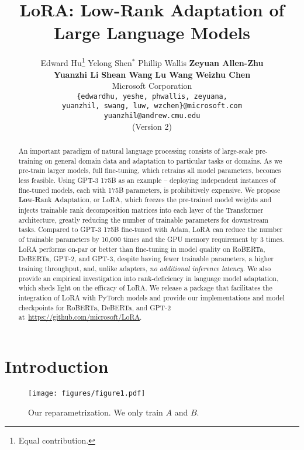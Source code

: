 \documentclass{article} %
\title{LoRA: Low-Rank Adaptation of Large Language Models}
\author{%
  Edward Hu\thanks{Equal contribution.} 
  \qquad Yelong Shen$^*$ 
  \qquad Phillip Wallis
  \qquad \textbf{Zeyuan Allen-Zhu} \\
  \textbf{Yuanzhi Li}
  \qquad \textbf{Shean Wang}
  \qquad \textbf{Lu Wang}
  \qquad \textbf{Weizhu Chen}\\
  Microsoft Corporation \\
  \texttt{\{edwardhu, yeshe, phwallis, zeyuana,} \\
  \texttt{yuanzhil, swang, luw, wzchen\}@microsoft.com} \\
  \texttt{yuanzhil@andrew.cmu.edu} \\
  (Version 2)}
\begin{document}
\maketitle

\begin{abstract}
An important paradigm of natural language processing consists of large-scale pre-training on general domain data and adaptation to particular tasks or domains.
As we pre-train larger models, full fine-tuning, which retrains all model parameters, becomes less feasible.
Using GPT-3 175B as an example -- deploying independent instances of fine-tuned models, each with 175B parameters, is prohibitively expensive.
We propose \textbf{Lo}w-\textbf{R}ank \textbf{A}daptation, or LoRA, which freezes the pre-trained model weights and injects trainable rank decomposition matrices into each layer of the Transformer architecture, greatly reducing the number of trainable parameters for downstream tasks. 
Compared to GPT-3 175B fine-tuned with Adam, LoRA can reduce the number of trainable parameters by 10,000 times and the GPU memory requirement by 3 times.
LoRA performs on-par or better than fine-tuning in model quality on RoBERTa, DeBERTa, GPT-2, and GPT-3, despite having fewer trainable parameters, a higher training throughput, and, unlike adapters, \textit{no additional inference latency}.
We also provide an empirical investigation into rank-deficiency in language model adaptation, which sheds light on the efficacy of LoRA.
We release a package that facilitates the integration of LoRA with PyTorch models and provide our implementations and model checkpoints for RoBERTa, DeBERTa, and GPT-2 at~\url{https://github.com/microsoft/LoRA}.
\end{abstract}

\section{Introduction}

\begin{wrapfigure}{r}{0.29\textwidth}
  \centering
  \texttt{[image: figures/figure1.pdf]}
  \caption{Our reparametrization. We only train $A$ and $B$.}
  \label{fig:reparam}
\end{wrapfigure}
\end{document}
